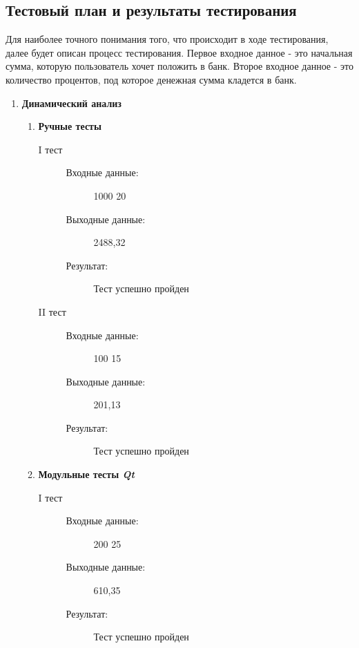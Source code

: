 \documentclass[12pt,a4paper]{report}
\begin{document}
\subsection{Тестовый план и результаты тестирования}
\hspace{\parindent}
Для наиболее точного понимания того, что происходит в ходе тестирования, далее будет описан процесс тестирования. Первое входное данное - это начальная сумма, которую пользователь хочет положить в банк. Второе входное данное - это количество процентов, под которое денежная сумма кладется в банк.
\begin{enumerate}
\item \textbf{Динамический анализ}
\begin{enumerate}
\item \textbf{Ручные тесты}

\begin{description}
\item[I тест]
\hspace{\parindent}
\begin{flushleft}
\begin{description}
\item[Входные данные:] 1000 20
\item[Выходные данные:] 2488,32
\item[Результат:] Тест успешно пройден
\end{description}
\end{flushleft}
\end{description}

\begin{description}
\item[II тест]
\hspace{\parindent}
\begin{flushleft}
\begin{description}
\item[Входные данные:] 100 15
\item[Выходные данные:] 201,13
\item[Результат:] Тест успешно пройден
\end{description}
\end{flushleft}
\end{description}

\item \textbf{Модульные тесты \textit{Qt}}
\begin{description}
\item[I тест]
\hspace{\parindent}
\begin{flushleft}
\begin{description}
\item[Входные данные:] 200 25
\item[Выходные данные:] 610,35
\item[Результат:] Тест успешно пройден
\end{description}
\end{flushleft}
\end{description}


\end{enumerate}
\end{enumerate}
\end{document}
